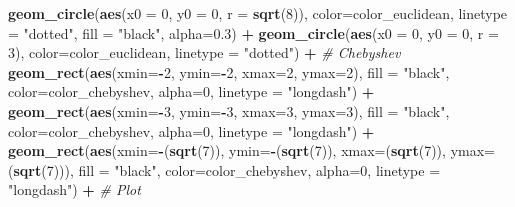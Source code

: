 \documentclass[]{article}
\newenvironment{Shaded}{\begin{snugshade}}{\end{snugshade}}
\newcommand{\CommentTok}[1]{\textcolor[rgb]{0.56,0.35,0.01}{\textit{#1}}}
\newcommand{\DataTypeTok}[1]{\textcolor[rgb]{0.13,0.29,0.53}{#1}}
\newcommand{\DecValTok}[1]{\textcolor[rgb]{0.00,0.00,0.81}{#1}}
\newcommand{\FloatTok}[1]{\textcolor[rgb]{0.00,0.00,0.81}{#1}}
\newcommand{\KeywordTok}[1]{\textcolor[rgb]{0.13,0.29,0.53}{\textbf{#1}}}
\newcommand{\NormalTok}[1]{#1}
\newcommand{\OperatorTok}[1]{\textcolor[rgb]{0.81,0.36,0.00}{\textbf{#1}}}
\newcommand{\StringTok}[1]{\textcolor[rgb]{0.31,0.60,0.02}{#1}}
\begin{document}
\begin{Shaded}
\begin{Highlighting}[]
\StringTok{  }\KeywordTok{geom_circle}\NormalTok{(}\KeywordTok{aes}\NormalTok{(}\DataTypeTok{x0 =} \DecValTok{0}\NormalTok{, }\DataTypeTok{y0 =} \DecValTok{0}\NormalTok{, }\DataTypeTok{r =} \KeywordTok{sqrt}\NormalTok{(}\DecValTok{8}\NormalTok{)),  }\DataTypeTok{color=}\NormalTok{color_euclidean, }\DataTypeTok{linetype =} \StringTok{"dotted"}\NormalTok{, }\DataTypeTok{fill =} \StringTok{"black"}\NormalTok{, }\DataTypeTok{alpha=}\FloatTok{0.3}\NormalTok{) }\OperatorTok{+}
\StringTok{  }\KeywordTok{geom_circle}\NormalTok{(}\KeywordTok{aes}\NormalTok{(}\DataTypeTok{x0 =} \DecValTok{0}\NormalTok{, }\DataTypeTok{y0 =} \DecValTok{0}\NormalTok{, }\DataTypeTok{r =} \DecValTok{3}\NormalTok{),  }\DataTypeTok{color=}\NormalTok{color_euclidean, }\DataTypeTok{linetype =} \StringTok{"dotted"}\NormalTok{) }\OperatorTok{+}
\StringTok{  }\CommentTok{# Chebyshev}
\StringTok{  }\KeywordTok{geom_rect}\NormalTok{(}\KeywordTok{aes}\NormalTok{(}\DataTypeTok{xmin=}\OperatorTok{-}\DecValTok{2}\NormalTok{, }\DataTypeTok{ymin=}\OperatorTok{-}\DecValTok{2}\NormalTok{, }\DataTypeTok{xmax=}\DecValTok{2}\NormalTok{, }\DataTypeTok{ymax=}\DecValTok{2}\NormalTok{), }\DataTypeTok{fill =} \StringTok{"black"}\NormalTok{, }\DataTypeTok{color=}\NormalTok{color_chebyshev, }\DataTypeTok{alpha=}\DecValTok{0}\NormalTok{, }\DataTypeTok{linetype =} \StringTok{"longdash"}\NormalTok{) }\OperatorTok{+}
\StringTok{  }\KeywordTok{geom_rect}\NormalTok{(}\KeywordTok{aes}\NormalTok{(}\DataTypeTok{xmin=}\OperatorTok{-}\DecValTok{3}\NormalTok{, }\DataTypeTok{ymin=}\OperatorTok{-}\DecValTok{3}\NormalTok{, }\DataTypeTok{xmax=}\DecValTok{3}\NormalTok{, }\DataTypeTok{ymax=}\DecValTok{3}\NormalTok{), }\DataTypeTok{fill =} \StringTok{"black"}\NormalTok{, }\DataTypeTok{color=}\NormalTok{color_chebyshev, }\DataTypeTok{alpha=}\DecValTok{0}\NormalTok{, }\DataTypeTok{linetype =} \StringTok{"longdash"}\NormalTok{) }\OperatorTok{+}
\StringTok{  }\KeywordTok{geom_rect}\NormalTok{(}\KeywordTok{aes}\NormalTok{(}\DataTypeTok{xmin=}\OperatorTok{-}\NormalTok{(}\KeywordTok{sqrt}\NormalTok{(}\DecValTok{7}\NormalTok{)), }\DataTypeTok{ymin=}\OperatorTok{-}\NormalTok{(}\KeywordTok{sqrt}\NormalTok{(}\DecValTok{7}\NormalTok{)), }\DataTypeTok{xmax=}\NormalTok{(}\KeywordTok{sqrt}\NormalTok{(}\DecValTok{7}\NormalTok{)), }\DataTypeTok{ymax=}\NormalTok{(}\KeywordTok{sqrt}\NormalTok{(}\DecValTok{7}\NormalTok{))), }\DataTypeTok{fill =} \StringTok{"black"}\NormalTok{, }\DataTypeTok{color=}\NormalTok{color_chebyshev, }\DataTypeTok{alpha=}\DecValTok{0}\NormalTok{, }\DataTypeTok{linetype =} \StringTok{"longdash"}\NormalTok{) }\OperatorTok{+}
\StringTok{  }\CommentTok{# Plot}

\end{Highlighting}
\end{Shaded}
\end{document}
